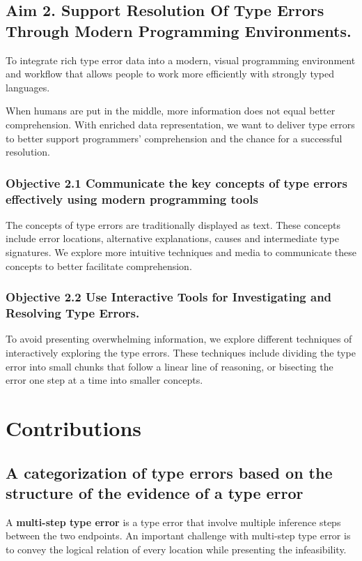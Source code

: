 \subsection{Aim 2. Support Resolution Of Type Errors Through Modern Programming Environments.}

To integrate rich type error data into a modern, visual programming environment and workflow that allows people to work more efficiently with strongly typed languages.


When humans are put in the middle, more information does not equal better comprehension. With enriched data representation, we want to deliver type errors to better support programmers’ comprehension and the chance for a successful resolution.

\subsubsection{Objective 2.1 Communicate the key concepts of type errors effectively using modern programming tools}

The concepts of type errors are traditionally displayed as text. These concepts include error locations, alternative explanations, causes and intermediate type signatures. We explore more intuitive techniques and media to communicate these concepts to better facilitate comprehension.

\subsubsection{Objective 2.2 Use Interactive Tools for Investigating and Resolving Type Errors.}

To avoid presenting overwhelming information, we explore different techniques of interactively exploring the type errors. These techniques include dividing the type error into small chunks that follow a linear line of reasoning, or bisecting the error one step at a time into smaller concepts.


\section{Contributions}


\subsection{A categorization of type errors based on the structure of the evidence of a type error}

A \textbf{multi-step type error} is a type error that involve multiple inference steps between the two endpoints. An important challenge with multi-step type error is to convey the logical relation of every location while presenting the infeasibility. 

